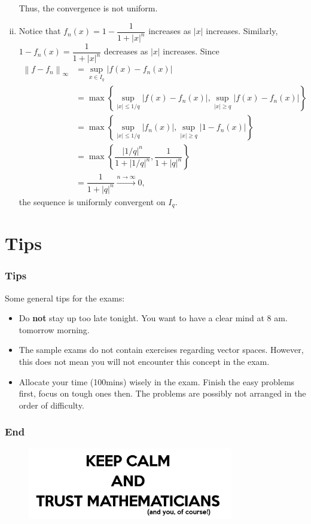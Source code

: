 \documentclass[10pt, t]{beamer}
\begin{document}
\begin{frame}[allowframebreaks]
\begin{enumerate}[i)]
        Thus, the convergence is not uniform.
        \item Notice that $f_n(x) = 1-\dfrac{1}{1+|x|^n}$ increases as $|x|$ increases. Similarly, $1-f_n(x) = \dfrac{1}{1+|x|^n}$ decreases as $|x|$ increases. Since 
        \begin{align*}
        \left\|f-f_n\right\|_\infty & = \underset{x\in I_q}{\sup}|f(x)-f_n(x)|\\
        & = \max\left\{\underset{|x|\leq 1/q}{\sup}|f(x)-f_n(x)|,\underset{|x|\geq q}{\sup}|f(x)-f_n(x)|  \right\}\\
        & = \max\left\{\underset{|x|\leq 1/q}{\sup}|f_n(x)|,\underset{|x|\geq q}{\sup}|1-f_n(x)|  \right\}\\
        & = \max\left\{\dfrac{|1/q|^n}{1+|1/q|^n}, \dfrac{1}{1+|q|^n}  \right\}\\
        & = \dfrac{1}{1+|q|^n} \overset{n\to \infty}{\longrightarrow } 0,
        \end{align*}
        the sequence is uniformly convergent on $I_q$.
    \end{enumerate}
\end{frame}

\section{Tips}
\begin{frame}
    \frametitle{Tips}
    Some general tips for the exams:
    \begin{itemize}
        \item Do \textbf{not} stay up too late tonight. You want to have a clear mind at 8 am. tomorrow morning.
        \item The sample exams do not contain exercises regarding vector spaces. However, this does not mean you will not encounter this concept in the exam.
        \item Allocate your time (100mins) wisely in the exam. Finish the easy problems first, focus on tough ones then. The problems are possibly not arranged in the order of difficulty.
    \end{itemize}   
\end{frame}


\begin{frame}
    \frametitle{End}
    \vspace{1.3cm}
    \begin{figure}[H]
        \centering
        \includegraphics[width=0.8\textwidth]{2020-11-17-22-35-50.png}
    \end{figure}
    
\end{frame}
\end{document}
